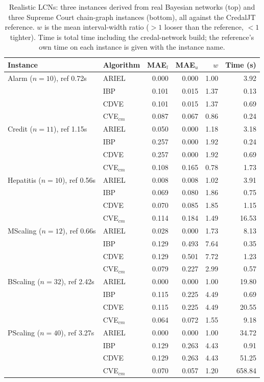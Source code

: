 \documentclass{article}
\begin{document}
\begin{table}[!b]
\centering
\footnotesize
\begin{tabular}{llrrrr}
\toprule
Instance & Algorithm & MAE$_{l}$ & MAE$_{u}$ & $w$ & Time (s) \\
\midrule
Alarm ($n{=}10$), ref 0.72s & ARIEL & 0.000 & 0.000 & 1.00 & 3.92 \\
 & IBP & 0.101 & 0.015 & 1.37 & 0.13 \\
 & CDVE & 0.101 & 0.015 & 1.37 & 0.69 \\
 & CVE$_{cm}$ & 0.087 & 0.067 & 0.86 & 0.24 \\
\hline
Credit ($n{=}11$), ref 1.15s & ARIEL & 0.050 & 0.000 & 1.18 & 3.18 \\
 & IBP & 0.257 & 0.000 & 1.92 & 0.24 \\
 & CDVE & 0.257 & 0.000 & 1.92 & 0.69 \\
 & CVE$_{cm}$ & 0.108 & 0.165 & 0.78 & 1.73 \\
\hline
Hepatitis ($n{=}10$), ref 0.56s & ARIEL & 0.008 & 0.008 & 1.02 & 3.91 \\
 & IBP & 0.069 & 0.080 & 1.86 & 0.75 \\
 & CDVE & 0.070 & 0.085 & 1.85 & 1.15 \\
 & CVE$_{cm}$ & 0.114 & 0.184 & 1.49 & 16.53 \\
\hline
MScaling ($n{=}12$), ref 0.66s & ARIEL & 0.028 & 0.000 & 1.73 & 8.13 \\
 & IBP & 0.129 & 0.493 & 7.64 & 0.35 \\
 & CDVE & 0.129 & 0.501 & 7.72 & 1.23 \\
 & CVE$_{cm}$ & 0.079 & 0.227 & 2.99 & 0.57 \\
\hline
BScaling ($n{=}32$), ref 2.42s & ARIEL & 0.000 & 0.000 & 1.00 & 19.80 \\
 & IBP & 0.115 & 0.225 & 4.49 & 0.69 \\
 & CDVE & 0.115 & 0.225 & 4.49 & 20.55 \\
 & CVE$_{cm}$ & 0.064 & 0.072 & 1.55 & 9.18 \\
\hline
PScaling ($n{=}40$), ref 3.27s & ARIEL & 0.000 & 0.000 & 1.00 & 34.72 \\
 & IBP & 0.129 & 0.263 & 4.43 & 0.91 \\
 & CDVE & 0.129 & 0.263 & 4.43 & 51.25 \\
 & CVE$_{cm}$ & 0.070 & 0.057 & 1.20 & 658.84 \\
\bottomrule
\end{tabular}
\caption{Realistic LCNs: three instances derived from real Bayesian networks
(top) and three Supreme Court chain-graph instances (bottom), all against the
CredalJT reference. $w$ is the mean interval-width ratio ($>1$ looser than the
reference, $<1$ tighter). Time is total time including the
credal-network build; the reference's own time on each instance is given with the
instance name.}
\label{tab:real}
\end{table}
\end{document}
